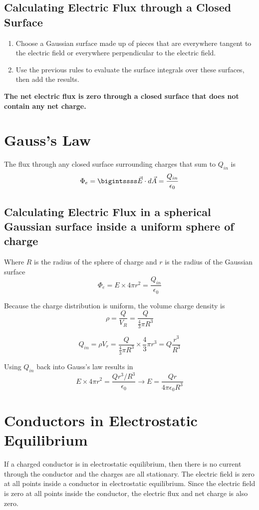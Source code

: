 \documentclass{article}
\begin{document}
\subsection*{Calculating Electric Flux through a Closed Surface}
\begin{enumerate}
    \item Choose a Gaussian surface made up of pieces that are everywhere tangent to the electric
    field or everywhere perpendicular to the electric field.
    \item Use the previous rules to evaluate the surface integrals over these surfaces, then add
    the results.
\end{enumerate}
\textbf{The net electric flux is zero through a closed surface that does not contain any net
charge.}

\section*{Gauss's Law}
The flux through any closed surface surrounding charges that sum to $Q_{in}$ is
\[\Phi_e = \bigintssss \vec{E}\cdot d\vec{A} = \frac{Q_{in}}{\epsilon_0}\]

\subsection*{Calculating Electric Flux in a spherical Gaussian surface inside a uniform sphere of
charge}
Where $R$ is the radius of the sphere of charge and $r$ is the radius of the Gaussian surface
\[\Phi_e = E\times 4\pi r^2 = \frac{Q_{in}}{\epsilon_0}\]

Because the charge distribution is uniform, the volume charge density is
\[\rho = \frac{Q}{V_R} = \frac{Q}{\frac{4}{3}\pi R^3}\]

\[Q_{in} = \rho V_r=\frac{Q}{\frac{4}{3}\pi R^3}\times\frac{4}{3}\pi r^3=Q\frac{r^3}{R^3}\]

Using $Q_{in}$ back into Gauss's law results in
\[E\times 4\pi r^2 = \frac{Qr^3 / R^3}{\epsilon_0}\rightarrow E=\frac{Qr}{4\pi\epsilon_0 R^3}\]

\section*{Conductors in Electrostatic Equilibrium}
If a charged conductor is in electrostatic equilibrium, then there is no current through the
conductor and the charges are all stationary. The electric field is zero at all points inside a
conductor in electrostatic equilibrium. Since the electric field is zero at all points inside the
conductor, the electric flux and net charge is also zero.\newline
\end{document}
